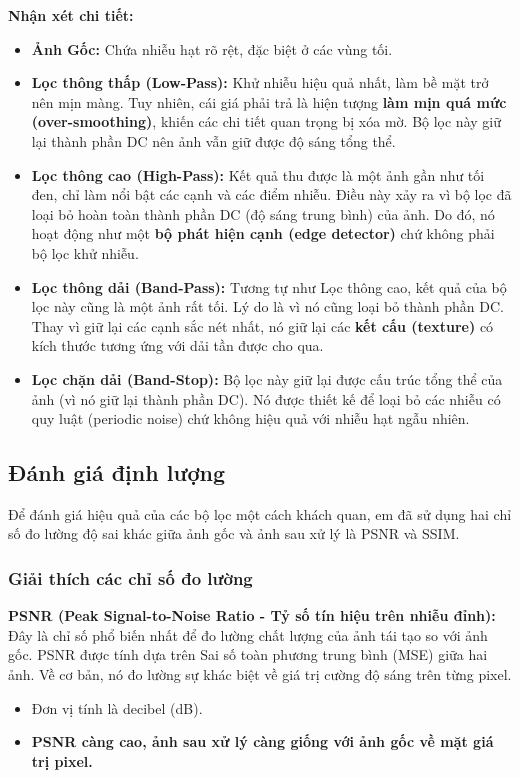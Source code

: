 \documentclass[12pt, a4paper]{article}
\begin{document}
	\textbf{Nhận xét chi tiết:}
	\begin{itemize}
		\item \textbf{Ảnh Gốc:} Chứa nhiễu hạt rõ rệt, đặc biệt ở các vùng tối.
		
		\item \textbf{Lọc thông thấp (Low-Pass):} Khử nhiễu hiệu quả nhất, làm bề mặt trở nên mịn màng. Tuy nhiên, cái giá phải trả là hiện tượng \textbf{làm mịn quá mức (over-smoothing)}, khiến các chi tiết quan trọng bị xóa mờ. Bộ lọc này giữ lại thành phần DC nên ảnh vẫn giữ được độ sáng tổng thể.
		
		\item \textbf{Lọc thông cao (High-Pass):} Kết quả thu được là một ảnh gần như tối đen, chỉ làm nổi bật các cạnh và các điểm nhiễu. Điều này xảy ra vì bộ lọc đã loại bỏ hoàn toàn thành phần DC (độ sáng trung bình) của ảnh. Do đó, nó hoạt động như một \textbf{bộ phát hiện cạnh (edge detector)} chứ không phải bộ lọc khử nhiễu.
		
		\item \textbf{Lọc thông dải (Band-Pass):} Tương tự như Lọc thông cao, kết quả của bộ lọc này cũng là một ảnh rất tối. Lý do là vì nó cũng loại bỏ thành phần DC. Thay vì giữ lại các cạnh sắc nét nhất, nó giữ lại các \textbf{kết cấu (texture)} có kích thước tương ứng với dải tần được cho qua.
		
		\item \textbf{Lọc chặn dải (Band-Stop):} Bộ lọc này giữ lại được cấu trúc tổng thể của ảnh (vì nó giữ lại thành phần DC). Nó được thiết kế để loại bỏ các nhiễu có quy luật (periodic noise) chứ không hiệu quả với nhiễu hạt ngẫu nhiên.
	\end{itemize}
	
	\subsection{Đánh giá định lượng}
	Để đánh giá hiệu quả của các bộ lọc một cách khách quan, em đã sử dụng hai chỉ số đo lường độ sai khác giữa ảnh gốc và ảnh sau xử lý là PSNR và SSIM.
	
	\subsubsection{Giải thích các chỉ số đo lường}
	\textbf{PSNR (Peak Signal-to-Noise Ratio - Tỷ số tín hiệu trên nhiễu đỉnh):} Đây là chỉ số phổ biến nhất để đo lường chất lượng của ảnh tái tạo so với ảnh gốc. PSNR được tính dựa trên Sai số toàn phương trung bình (MSE) giữa hai ảnh. Về cơ bản, nó đo lường sự khác biệt về giá trị cường độ sáng trên từng pixel.
	\begin{itemize}
		\item Đơn vị tính là decibel (dB).
		\item \textbf{PSNR càng cao, ảnh sau xử lý càng giống với ảnh gốc về mặt giá trị pixel.}
	\end{itemize}
	
\end{document}

